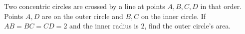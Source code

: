 Two concentric circles are crossed by a line at points $A,B,C,D$ in that order. Points $A,D$ are on the outer circle and $B,C$ on the inner circle. If $AB=BC=CD=2$ and the inner radius is $2$, find the outer circle's area.
